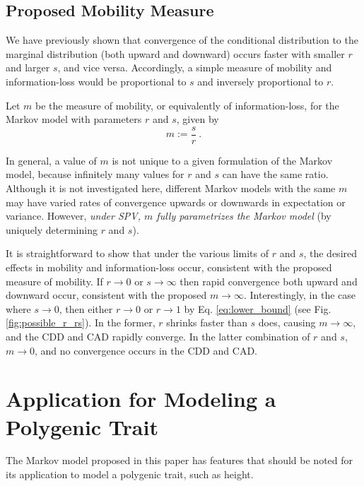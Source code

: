 \documentclass{svproc} %
\begin{document}
\subsection{Proposed Mobility Measure}
We have previously shown that convergence of the conditional distribution to the marginal distribution (both upward and downward) occurs faster with smaller $r$ and larger $s$, and vice versa. Accordingly, a simple measure of mobility and information-loss would be proportional to $s$ and inversely proportional to $r$. 

\begin{definition}
Let $m$ be the measure of mobility, or equivalently of information-loss, for the Markov model with parameters $r$ and $s$, given by
\begin{equation}
m := \frac{s}{r} \ .
\end{equation}
\label{def:m}
\end{definition}

In general, a value of $m$ is not unique to a given formulation of the Markov model, because infinitely many values for $r$ and $s$ can have the same ratio. Although it is not investigated here, different Markov models with the same $m$ may have varied rates of convergence upwards or downwards in expectation or variance. However, \emph{under SPV, $m$ fully parametrizes the Markov model} (by uniquely determining $r$ and $s$). 

It is straightforward to show that under the various limits of $r$ and $s$, the desired effects in mobility and information-loss occur, consistent with the proposed measure of mobility. If $r \rightarrow 0$ or $s \rightarrow \infty$ then rapid convergence both upward and downward occur, consistent with the proposed $m \rightarrow \infty$. Interestingly, in the case where $s \rightarrow 0$, then either $r \rightarrow 0$ or $r \rightarrow 1$ by Eq. \ref{eq:lower_bound} (see Fig. \ref{fig:possible_r_rs}). In the former, $r$ shrinks faster than $s$ does, causing $m \rightarrow \infty$, and the CDD and CAD rapidly converge. In the latter combination of $r$ and $s$, $m \rightarrow 0$, and no convergence occurs in the CDD and CAD. 


\section{Application for Modeling a Polygenic Trait}

The Markov model proposed in this paper has features that should be noted for its application to model a polygenic trait, such as height. 
\end{document}
